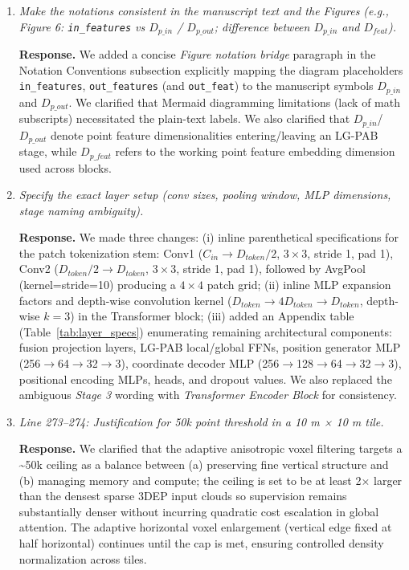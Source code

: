 \documentclass[11pt]{article}
\newcommand{\response}{\textbf{Response.} }
\begin{document}
\begin{enumerate}

  \item \emph{Make the notations consistent in the manuscript text and the Figures (e.g., Figure 6: \texttt{in\_features} vs $D_{p\_in}$ / $D_{p\_out}$; difference between $D_{p\_in}$ and $D_{feat}$).}

  \response We added a concise \emph{Figure notation bridge} paragraph in the Notation Conventions subsection explicitly mapping the diagram placeholders \texttt{in\_features}, \texttt{out\_features} (and \texttt{out\_feat}) to the manuscript symbols $D_{p\_in}$ and $D_{p\_out}$. We clarified that Mermaid diagramming limitations (lack of math subscripts) necessitated the plain-text labels. We also clarified that $D_{p\_in}$/$D_{p\_out}$ denote point feature dimensionalities entering/leaving an LG-PAB stage, while $D_{p\_feat}$ refers to the working point feature embedding dimension used across blocks.

  \item \emph{Specify the exact layer setup (conv sizes, pooling window, MLP dimensions, stage naming ambiguity).}

  \response We made three changes: (i) inline parenthetical specifications for the patch tokenization stem: Conv1 ($C_{in}\rightarrow D_{token}/2$, $3\times3$, stride 1, pad 1), Conv2 ($D_{token}/2\rightarrow D_{token}$, $3\times3$, stride 1, pad 1), followed by AvgPool (kernel=stride=10) producing a $4\times4$ patch grid; (ii) inline MLP expansion factors and depth-wise convolution kernel ($D_{token}\rightarrow 4D_{token} \rightarrow D_{token}$, depth-wise $k=3$) in the Transformer block; (iii) added an Appendix table (Table~\ref{tab:layer_specs}) enumerating remaining architectural components: fusion projection layers, LG-PAB local/global FFNs, position generator MLP (256$\rightarrow$64$\rightarrow$32$\rightarrow$3), coordinate decoder MLP (256$\rightarrow$128$\rightarrow$64$\rightarrow$32$\rightarrow$3), positional encoding MLPs, heads, and dropout values. We also replaced the ambiguous \emph{Stage 3} wording with \emph{Transformer Encoder Block} for consistency.

  \item \emph{Line 273–274: Justification for 50k point threshold in a 10 m × 10 m tile.}

  \response We clarified that the adaptive anisotropic voxel filtering targets a \textasciitilde50k ceiling as a balance between (a) preserving fine vertical structure and (b) managing memory and compute; the ceiling is set to be at least 2× larger than the densest sparse 3DEP input clouds so supervision remains substantially denser without incurring quadratic cost escalation in global attention. The adaptive horizontal voxel enlargement (vertical edge fixed at half horizontal) continues until the cap is met, ensuring controlled density normalization across tiles.


\end{enumerate}
\end{document}

